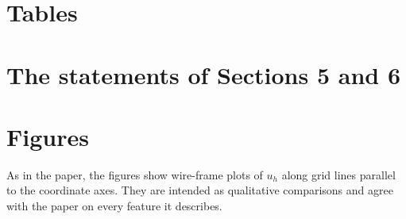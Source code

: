 \documentclass[11pt]{article}
\begin{document}
\section{Tables}\label{sec:tables}




\section{The statements of Sections 5 and 6}\label{sec:checks}



\section{Figures}\label{sec:figs}

As in the paper, the figures show wire-frame plots of $u_h$ along grid lines parallel to the coordinate axes. They
are intended as qualitative comparisons and agree with the paper on every feature it describes.
\end{document}
